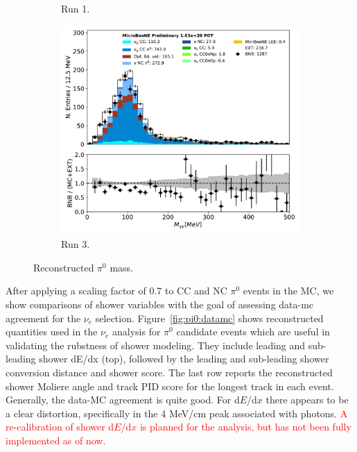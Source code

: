 \documentclass[a4paper]{article}
\begin{document}
\begin{figure}[H]
\begin{center}
\begin{subfigure}[b]{0.3\textwidth}
    \caption{\label{fig:pi0:mass:5E19} Run 1.}
    \end{subfigure}
    \begin{subfigure}[b]{0.3\textwidth}
    \centering
    \includegraphics[width=1.00\textwidth]{pi0/pi0_mass_Y_01142020sel_RUN3.pdf}
    \caption{\label{fig:pi0:mass:5E19} Run 3.}
    \end{subfigure}
\caption{\label{fig:pi0:mass}Reconstructed $\pi^0$ mass.}
\end{center}
\end{figure}

\par After applying a scaling factor of 0.7 to CC and NC $\pi^0$ events in the MC, we show comparisons of shower variables with the goal of assessing data-mc agreement for the $\nu_e$ selection. Figure~\ref{fig:pi0:datamc} shows reconstructed quantities used in the $\nu_e$ analysis for $\pi^0$ candidate events which are useful in validating the rubstness of shower modeling. They include leading and sub-leading shower dE/dx (top), followed by the leading and sub-leading shower conversion distance and shower score. The last row reports the reconstructed shower Moliere angle and track PID score for the longest track in each event. Generally, the data-MC agreement is quite good. For d$E$/d$x$ there appears to be a clear distortion, specifically in the 4 MeV/cm peak associated with photons. \textcolor{red}{A re-calibration of shower d$E$/d$x$ is planned for the analysis, but has not been fully implemented as of now.}
\end{document}
